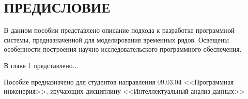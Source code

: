 \chapter*{ПРЕДИСЛОВИЕ}

В данном пособии представлено описание подхода к разработке программной системы, предназначенной для моделирования временных рядов. Освещены особенности построения научно-исследовательского программного обеспечения.

В главе 1 представлено...

Пособие предназначено для студентов направления 09.03.04 <<Программная инженерия>>, 
изучающих дисциплину <<Интеллектуальный анализ данных>>
